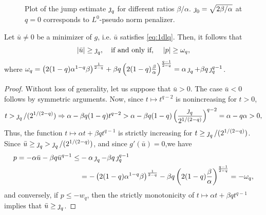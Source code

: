\begin{figure}[ht!]
	\begin{center}
\caption{Plot of the jump estimate  $\operatorname{\jmath}_q$ for different ratios $\beta/\alpha$. $\operatorname{\jmath}_0= \sqrt{2\beta/\alpha}$ at $q=0$ corresponds to $L^0$-pseudo norm penalizer.}	
\label{fig:jump}
\end{center}
\end{figure}
	

\begin{lemma}\label{l:thresholds} Let $\bar u \not =0$ be a minimizer of $g$, i.e. $\bar u$ satisfies \eqref{eq:1dlq}. Then, it follows that
$$|\bar u| \geq \operatorname{\jmath}_q, \quad \text{if and only if, }\quad |p|\geq \omega_q ,$$
where $\omega_q=\left( 2(1-q) \alpha^{1-q}\beta \right)^{\frac{1}{2-q}} + \beta q \left(2(1-q) \frac{\beta}{\alpha} \right)^{\frac{q-1}{2-q}}=\alpha\operatorname{\jmath}_q+\beta q\operatorname{\jmath}_q^{q-1}$.
\end{lemma}
\begin{proof}
Without loss of generality, let us suppose that $\bar u >0$. The case $\bar u <0$ follows by 
symmetric arguments. Now, since $t\mapsto t^{q-2}$ is nonincreasing for $t>0$,   
$$
t>\operatorname{\jmath}_q/(2^{1/(2-q)})\Rightarrow  \alpha -\beta q(1-q)  t^{q-2} > \alpha - \beta q(1-q)  \left(\frac{\operatorname{\jmath}_q}{2^{1/(2-q)}}\right)^{q-2} = \alpha - q\alpha >0,
$$
Thus, the function $t \mapsto \alpha t + \beta q t^{q-1}$ is strictly increasing for $t\geq\operatorname{\jmath}_q/(2^{1/(2-q)})$. 
Since $\bar u \geq \operatorname{\jmath}_q>\operatorname{\jmath}_q/(2^{1/(2-q)})$, and since $g'(\bar u)=0$,we have
	\begin{align}
		p = -\alpha \bar u - \beta q \bar u^{q-1}\leq & -\alpha \operatorname{\jmath}_q - \beta q  \operatorname{\jmath}_q^{q-1} \nonumber\\
		&=-\left( 2(1-q) \alpha^{1-q}\beta \right)^{\frac{1}{2-q}} - \beta q \left(2(1-q) \frac{\beta}{\alpha} \right)^{\frac{q-1}{2-q}}=-\omega_q,  \nonumber
	\end{align}
 and conversely, if $p\leq -w_q$, then the strictly monotonicity of $t \mapsto \alpha t + \beta q t^{q-1}$  implies that $\bar u\geq\operatorname{\jmath}_q$.
\end{proof}

